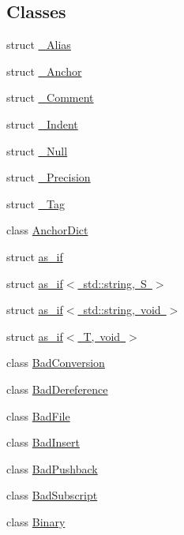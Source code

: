 \subsection*{Classes}
\begin{DoxyCompactItemize}
\item 
struct \mbox{\hyperlink{struct_y_a_m_l_1_1___alias}{\+\_\+\+Alias}}
\item 
struct \mbox{\hyperlink{struct_y_a_m_l_1_1___anchor}{\+\_\+\+Anchor}}
\item 
struct \mbox{\hyperlink{struct_y_a_m_l_1_1___comment}{\+\_\+\+Comment}}
\item 
struct \mbox{\hyperlink{struct_y_a_m_l_1_1___indent}{\+\_\+\+Indent}}
\item 
struct \mbox{\hyperlink{struct_y_a_m_l_1_1___null}{\+\_\+\+Null}}
\item 
struct \mbox{\hyperlink{struct_y_a_m_l_1_1___precision}{\+\_\+\+Precision}}
\item 
struct \mbox{\hyperlink{struct_y_a_m_l_1_1___tag}{\+\_\+\+Tag}}
\item 
class \mbox{\hyperlink{class_y_a_m_l_1_1_anchor_dict}{Anchor\+Dict}}
\item 
struct \mbox{\hyperlink{struct_y_a_m_l_1_1as__if}{as\+\_\+if}}
\item 
struct \mbox{\hyperlink{struct_y_a_m_l_1_1as__if_3_01std_1_1string_00_01_s_01_4}{as\+\_\+if$<$ std\+::string, S $>$}}
\item 
struct \mbox{\hyperlink{struct_y_a_m_l_1_1as__if_3_01std_1_1string_00_01void_01_4}{as\+\_\+if$<$ std\+::string, void $>$}}
\item 
struct \mbox{\hyperlink{struct_y_a_m_l_1_1as__if_3_01_t_00_01void_01_4}{as\+\_\+if$<$ T, void $>$}}
\item 
class \mbox{\hyperlink{class_y_a_m_l_1_1_bad_conversion}{Bad\+Conversion}}
\item 
class \mbox{\hyperlink{class_y_a_m_l_1_1_bad_dereference}{Bad\+Dereference}}
\item 
class \mbox{\hyperlink{class_y_a_m_l_1_1_bad_file}{Bad\+File}}
\item 
class \mbox{\hyperlink{class_y_a_m_l_1_1_bad_insert}{Bad\+Insert}}
\item 
class \mbox{\hyperlink{class_y_a_m_l_1_1_bad_pushback}{Bad\+Pushback}}
\item 
class \mbox{\hyperlink{class_y_a_m_l_1_1_bad_subscript}{Bad\+Subscript}}
\item 
class \mbox{\hyperlink{class_y_a_m_l_1_1_binary}{Binary}}
\item 

\end{DoxyCompactItemize}
